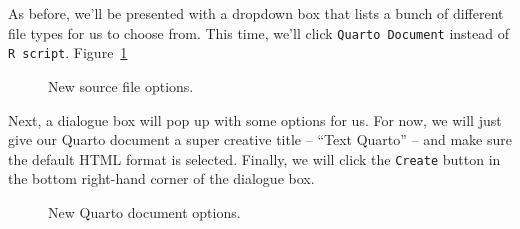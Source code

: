 \documentclass[
  letterpaper,
  DIV=11,
  numbers=noendperiod]{scrreprt}
\begin{document}
As before, we'll be presented with a dropdown box that lists a bunch of
different file types for us to choose from. This time, we'll click
\texttt{Quarto\ Document} instead of \texttt{R\ script}.
Figure~\ref{fig-new-quarto-document-02}

\begin{figure}


\caption{\label{fig-new-quarto-document-02}New source file options.}

\end{figure}%

Next, a dialogue box will pop up with some options for us. For now, we
will just give our Quarto document a super creative title -- ``Text
Quarto'' -- and make sure the default HTML format is selected. Finally,
we will click the \texttt{Create} button in the bottom right-hand corner
of the dialogue box.

\begin{figure}


\caption{\label{fig-new-quarto-document-03}New Quarto document options.}

\end{figure}%
\end{document}
